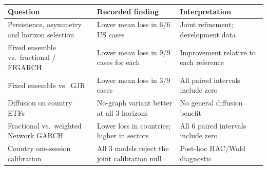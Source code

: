 \begin{tabular}{>{\raggedright\arraybackslash}p{}>{\raggedright\arraybackslash}p{}>{\raggedright\arraybackslash}p{}}
\toprule
Question & Recorded finding & Interpretation \\
\midrule
Persistence, asymmetry and horizon selection & Lower mean loss in 6/6 US cases & Joint refinement; development data \\
Fixed ensemble vs.\ fractional / FIGARCH & Lower mean loss in 9/9 cases for each & Improvement relative to each reference \\
Fixed ensemble vs.\ GJR & Lower mean loss in 3/9 cases & All paired intervals include zero \\
Diffusion on country ETFs & No-graph variant better at all 3 horizons & No general diffusion benefit \\
Fractional vs.\ weighted Network GARCH & Lower loss in countries; higher in sectors & All 6 paired intervals include zero \\
Country one-session calibration & All 3 models reject the joint calibration null & Post-hoc HAC/Wald diagnostic \\
\bottomrule
\end{tabular}
